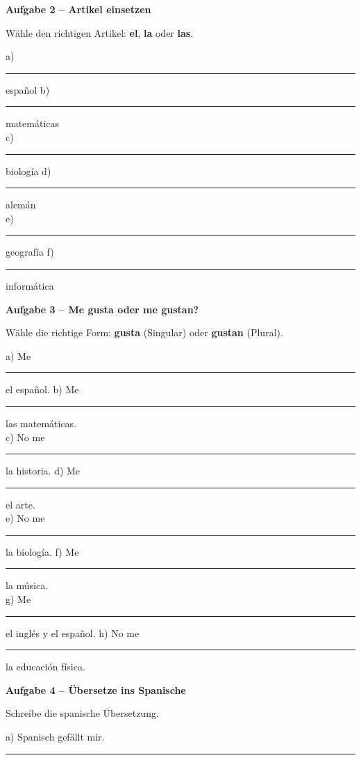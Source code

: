 \documentclass[11pt, a4paper]{article}
\newcommand{\fachfarbe}{spanisch}
\newcommand{\punktebox}[1]{\hfill\fbox{\small \_\_\_/#1}}
\newcommand{\luecke}[1]{\rule{#1}{0.4pt}}
\newenvironment{aufgabe}[1]{%
    \vspace{12pt}
    \noindent\textbf{\textcolor{\fachfarbe}{Aufgabe #1}}
    \vspace{6pt}
    \begin{list}{}{\leftmargin=0pt}
    \item[]
}{%
    \end{list}
}
\newcommand{\es}[1]{\textcolor{\fachfarbe}{\textbf{#1}}}
\begin{document}

\begin{aufgabe}{2 -- Artikel einsetzen}
Wähle den richtigen Artikel: \es{el}, \es{la} oder \es{las}. \punktebox{6}
\end{aufgabe}

\noindent
a) \luecke{1.5cm} español \hfill
b) \luecke{1.5cm} matemáticas \\[0.8em]
c) \luecke{1.5cm} biología \hfill
d) \luecke{1.5cm} alemán \\[0.8em]
e) \luecke{1.5cm} geografía \hfill
f) \luecke{1.5cm} informática \\

\vspace{15pt}


\begin{aufgabe}{3 -- Me gusta oder me gustan?}
Wähle die richtige Form: \es{gusta} (Singular) oder \es{gustan} (Plural). \punktebox{8}
\end{aufgabe}

\noindent
a) Me \luecke{2cm} el español. \hfill
b) Me \luecke{2cm} las matemáticas. \\[0.8em]
c) No me \luecke{2cm} la historia. \hfill
d) Me \luecke{2cm} el arte. \\[0.8em]
e) No me \luecke{2cm} la biología. \hfill
f) Me \luecke{2cm} la música. \\[0.8em]
g) Me \luecke{2cm} el inglés y el español. \hfill
h) No me \luecke{2cm} la educación física. \\

\vspace{15pt}


\begin{aufgabe}{4 -- Übersetze ins Spanische}
Schreibe die spanische Übersetzung. \punktebox{6}
\end{aufgabe}

\noindent
a) Spanisch gefällt mir. \\[1.2em]
\luecke{10cm} \\[1em]
\end{document}
